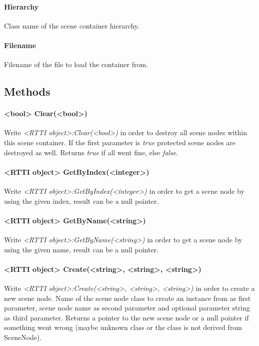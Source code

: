 \paragraph{Hierarchy}
Class name of the scene container hierarchy.

\paragraph{Filename}
Filename of the file to load the container from.


\subsection{Methods}

\paragraph{<bool> Clear(<bool>)}
Write \emph{<RTTI object>:Clear(<bool>)} in order to destroy all scene nodes within this scene container. If the first parameter is \emph{true} protected scene nodes are destroyed as well. Returns \emph{true} if all went fine, else \emph{false}.

\paragraph{<RTTI object> GetByIndex(<integer>)}
Write \emph{<RTTI object>:GetByIndex(<integer>)} in order to get a scene node by using the given index, result can be a null pointer.

\paragraph{<RTTI object> GetByName(<string>)}
Write \emph{<RTTI object>:GetByName(<string>)} in order to get a scene node by using the given name, result can be a null pointer.

\paragraph{<RTTI object> Create(<string>, <string>, <string>)}
Write \emph{<RTTI object>:Create(<string>, <string>, <string>)} in order to create a new scene node. Name of the scene node class to create an instance from as first parameter, scene node name as second parameter and optional parameter string as third parameter. Returns a pointer to the new scene node or a null pointer if something went wrong (maybe unknown class or the class is not derived from SceneNode).

